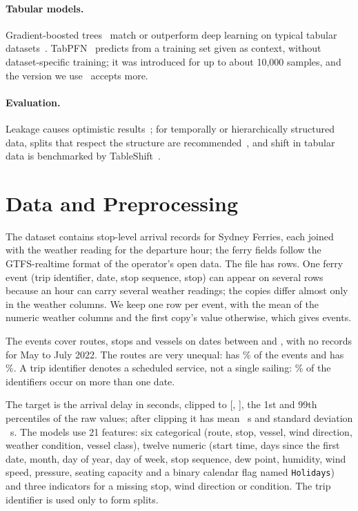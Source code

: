 \documentclass[runningheads]{llncs}
\begin{document}
\paragraph{Tabular models.}
Gradient-boosted trees~\cite{chen2016xgboost,ke2017lightgbm} match or
outperform deep learning on typical tabular
datasets~\cite{grinsztajn2022why,shwartzziv2022tabular}.
TabPFN~\cite{hollmann2025tabpfn} predicts from a training set given as
context, without dataset-specific training; it was introduced for up to
about 10{,}000 samples, and the version we use~\cite{jaeger2026tabpfn35}
accepts more.

\paragraph{Evaluation.}
Leakage causes optimistic results~\cite{kaufman2012leakage,kapoor2023leakage};
for temporally or hierarchically structured data, splits that respect the
structure are recommended~\cite{roberts2017crossvalidation}, and shift in
tabular data is benchmarked by TableShift~\cite{gardner2023tableshift}.

\section{Data and Preprocessing}
\label{sec:data}
The dataset contains stop-level arrival records for Sydney Ferries, each
joined with the weather reading for the departure hour; the ferry fields
follow the GTFS-realtime format of the operator's open data. The file has
\RawRows{} rows. One ferry event (trip identifier, date, stop sequence, stop)
can appear on several rows because an hour can carry several weather
readings; the copies differ almost only in the weather columns. We keep one
row per event, with the mean of the numeric weather columns and the first
copy's value otherwise, which gives \Events{} events.

The events cover \NRoutes{} routes, \NStops{} stops and \NVehicles{} vessels
on \DistinctDates{} dates between \DateMin{} and \DateMax{}, with no records
for May to July 2022. The routes are very unequal: \LargestRoute{} has
\LargestRouteShare\% of the events and \SmallestRoute{} has
\SmallestRouteShare\%. A trip identifier denotes a scheduled service, not a single
sailing: \TripsSeveralDatesPct\% of the \NTrips{} identifiers occur on more
than one date.

The target is the arrival delay in seconds, clipped to
[\WinsorLow{}, \WinsorHigh{}], the 1st and 99th percentiles of the raw
values; after clipping it has mean \TargetMean{}~s and standard deviation
\TargetStd{}~s. The models use 21 features: six categorical (route, stop,
vessel, wind direction, weather condition, vessel class), twelve numeric
(start time, days since the first date, month, day of year, day of week,
stop sequence, dew point, humidity, wind speed, pressure, seating capacity
and a binary calendar flag named \texttt{Holidays}) and three indicators for
a missing stop, wind direction or condition. The trip identifier
is used only to form splits.
\end{document}
